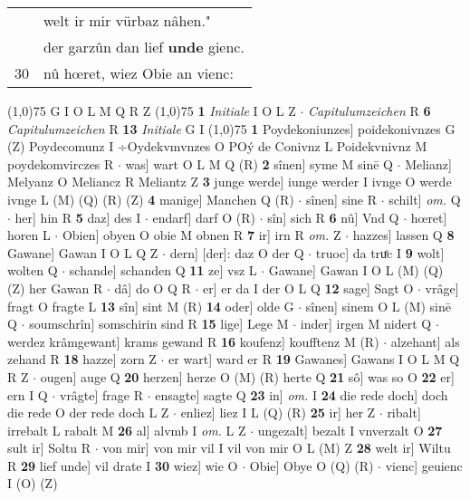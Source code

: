 \documentclass[8pt,a4paper,notitlepage]{article}
\begin{document}
\begin{table}[ht]
\begin{minipage}[t]{0.5\linewidth}
\begin{tabular}{rl}
 & welt ir mir vürbaz nâhen."\\ 
 & der garzûn dan lief \textbf{unde} gienc.\\ 
30 & nû hœret, wiez Obie an vienc:\\ 
\end{tabular}
\scriptsize
\line(1,0){75} \newline
G I O L M Q R Z \newline
\line(1,0){75} \newline
\textbf{1} \textit{Initiale} I O L Z   $\cdot$ \textit{Capitulumzeichen} R  \textbf{6} \textit{Capitulumzeichen} R  \textbf{13} \textit{Initiale} G I  \newline
\line(1,0){75} \newline
\textbf{1} Poydekoniunzes] poidekonivnzes G (Z) Poydecomunz I ÷Oydekvmvnzes O POý de Conivnz L Poidekvnivnz M poydekomvirczes R  $\cdot$ was] wart O L M Q (R) \textbf{2} sînen] syme M sinē Q  $\cdot$ Melianz] Melyanz O Meliancz R Meliantz Z \textbf{3} junge werde] iunge werder I ivnge O werde ivnge L (M) (Q) (R) (Z) \textbf{4} manige] Manchen Q (R)  $\cdot$ sînen] sine R  $\cdot$ schilt] \textit{om.} Q  $\cdot$ her] hin R \textbf{5} daz] des I  $\cdot$ endarf] darf O (R)  $\cdot$ sîn] sich R \textbf{6} nû] Vnd Q  $\cdot$ hœret] horen L  $\cdot$ Obien] obyen O obie M obnen R \textbf{7} ir] irn R \textit{om.} Z  $\cdot$ hazzes] lassen Q \textbf{8} Gawane] Gawan I O L Q Z  $\cdot$ dern] [der]: daz O der Q  $\cdot$ truoc] da truͤc I \textbf{9} wolt] wolten Q  $\cdot$ schande] schanden Q \textbf{11} ze] vsz L  $\cdot$ Gawane] Gawan I O L (M) (Q) (Z) her Gawan R  $\cdot$ dâ] do O Q R  $\cdot$ er] er da I der O L Q \textbf{12} sage] Sagt O  $\cdot$ vrâge] fragt O fragte L \textbf{13} sîn] sint M (R) \textbf{14} oder] olde G  $\cdot$ sînen] sinem O L (M) sinē Q  $\cdot$ soumschrîn] somschirin sind R \textbf{15} lige] Lege M  $\cdot$ inder] irgen M nidert Q  $\cdot$ werdez krâmgewant] krams gewand R \textbf{16} koufenz] koufftenz M (R)  $\cdot$ alzehant] als zehand R \textbf{18} hazze] zorn Z  $\cdot$ er wart] ward er R \textbf{19} Gawanes] Gawans I O L M Q R Z  $\cdot$ ougen] auge Q \textbf{20} herzen] herze O (M) (R) herte Q \textbf{21} sô] was so O \textbf{22} er] ern I Q  $\cdot$ vrâgte] frage R  $\cdot$ ensagte] sagte Q \textbf{23} in] \textit{om.} I \textbf{24} die rede doch] doch die rede O der rede doch L Z  $\cdot$ enliez] liez I L (Q) (R) \textbf{25} ir] her Z  $\cdot$ ribalt] irrebalt L rabalt M \textbf{26} al] alvmb I \textit{om.} L Z  $\cdot$ ungezalt] bezalt I vnverzalt O \textbf{27} sult ir] Soltu R  $\cdot$ von mir] von mir vil I vil von mir O L (M) Z \textbf{28} welt ir] Wiltu R \textbf{29} lief unde] vil drate I \textbf{30} wiez] wie O  $\cdot$ Obie] Obye O (Q) (R)  $\cdot$ vienc] geuienc I (O) (Z) \newline

\end{minipage}
\end{table}
\end{document}
